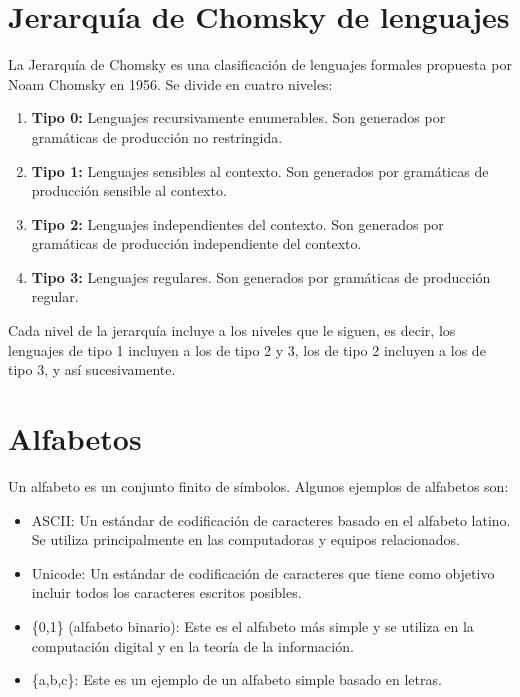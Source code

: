 \documentclass[11pt]{article}
\begin{document}
    \section{Jerarquía de Chomsky de lenguajes}

    La Jerarquía de Chomsky es una clasificación de lenguajes formales propuesta por Noam Chomsky en 1956. Se divide en cuatro niveles:

    \begin{enumerate}
        \item \textbf{Tipo 0:} Lenguajes recursivamente enumerables. Son generados por gramáticas de producción no restringida.
        \item \textbf{Tipo 1:} Lenguajes sensibles al contexto. Son generados por gramáticas de producción sensible al contexto.
        \item \textbf{Tipo 2:} Lenguajes independientes del contexto. Son generados por gramáticas de producción independiente del contexto.
        \item \textbf{Tipo 3:} Lenguajes regulares. Son generados por gramáticas de producción regular.
    \end{enumerate}

    Cada nivel de la jerarquía incluye a los niveles que le siguen, es decir, los lenguajes de tipo 1 incluyen a los de tipo 2 y 3, los de tipo 2 incluyen a los de tipo 3, y así sucesivamente.

    \bigskip %


    \section{Alfabetos}

    Un alfabeto es un conjunto finito de símbolos. Algunos ejemplos de alfabetos son:

    \begin{itemize}
        \item ASCII: Un estándar de codificación de caracteres basado en el alfabeto latino. Se utiliza principalmente en las computadoras y equipos relacionados.
        \item Unicode: Un estándar de codificación de caracteres que tiene como objetivo incluir todos los caracteres escritos posibles.
        \item \{0,1\} (alfabeto binario): Este es el alfabeto más simple y se utiliza en la computación digital y en la teoría de la información.
        \item \{a,b,c\}: Este es un ejemplo de un alfabeto simple basado en letras.
    \end{itemize}
\end{document}
